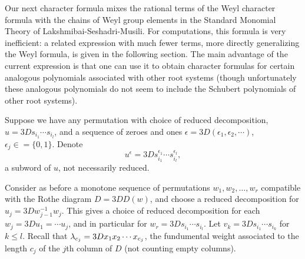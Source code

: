 Our next character formula mixes the rational terms
of the Weyl character formula with the chains of Weyl group
elements in the Standard Monomial Theory of Lakshmibai-Seshadri-Musili.
For computations, this formula is very inefficient:
a related expression with much fewer terms, more directly
generalizing the Weyl formula, is given in
the following section.  The main advantage of the current expression
is that one can use it to obtain character formulas for
certain analogous polynomials associated with other root systems
(though unfortunately these analogous polynomials do not seem to include
the Schubert polynomials of other root systems).

Suppose we have any permutation with choice of reduced decomposition,
$u =3D s_{i_1} \cdots s_{i_l}$,
and a sequence of zeroes and ones
$\epsilon =3D (\epsilon_1, \epsilon_2, \cdots )$, $\epsilon_j \in =
\{0,1\}$.
Denote
$$
u^{\epsilon} =3D s_{i_1}^{\epsilon_1} \cdots s_{i_l}^{\epsilon_l},
$$
a subword of $u$, not necessarily reduced.

Consider as before
a monotone sequence of permutations $w_1, w_2,\ldots,w_r$
compatible with the Rothe diagram $D =3D D(w)$, and
choose a reduced decomposition for
$u_j =3D w_{j-1}^{-1} w_j$.
This gives a choice of reduced decomposition for each $w_j =3D u_1 =
\cdots u_j$,
and in particular for $w_r =3D s_{i_1} \cdots s_{i_l}$.
Let $v_k =3D s_{i_1} \cdots s_{i_k}$ for $k \leq l$.
Recall that $\lambda_{c_j} =3D x_1 x_2 \cdots x_{c_j}$, the fundumental
weight associated to the length $c_j$ of the $j$th column of $D$
(not counting empty columns).


